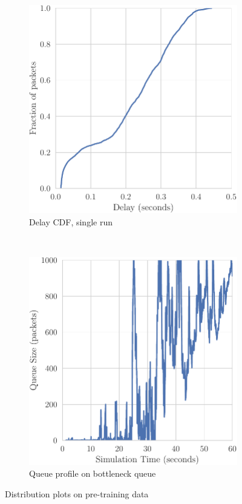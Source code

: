 \begin{figure}[h]
    \centering
    \begin{subfigure}[h]{0.5\textwidth}
        \centering
        \includegraphics[scale=0.65]{figures/delay.pdf}
        \caption{Delay CDF, single run}
    \end{subfigure}%
    ~ 
    \begin{subfigure}[h]{0.5\textwidth}
        \centering
        \includegraphics[scale=0.65]{figures/queue_profile_A.pdf}
        \caption{Queue profile on bottleneck queue}
    \end{subfigure}
    \caption{Distribution plots on pre-training data}
    \label{fig:datadist}
\end{figure}

